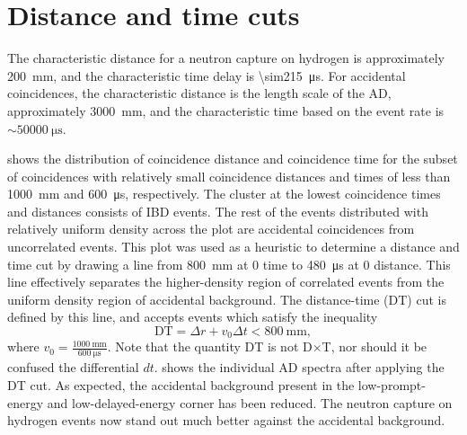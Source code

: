\section{Distance and time cuts}
\label{sec:DT_cut}

The characteristic distance for a neutron capture on hydrogen
is approximately \SI{200}{\milli\meter},
and the characteristic time delay is \SI{\sim215}{\us}.
For accidental coincidences, the characteristic distance is
the length scale of the AD, approximately \SI{3000}{\milli\meter},
and the characteristic time based on the  event rate
is $\sim\SI{50000}{\us}$.


 shows the distribution of
coincidence distance and coincidence time
for the subset of  coincidences with
relatively small coincidence distances and times
of less than \SI{1000}{\milli\meter} and \SI{600}{\micro\second},
respectively.
The cluster at the lowest coincidence times and distances
consists of IBD events.
The rest of the events distributed with relatively uniform density
across the plot are accidental coincidences from uncorrelated events.
This plot was used as a heuristic to determine a distance and time cut
by drawing a line from \SI{800}{\milli\meter} at $0$ time
to \SI{480}{\micro\second} at $0$ distance.
This line effectively separates the higher-density region
of correlated events from the uniform density region of accidental background.
The distance-time (DT) cut is defined by this line,
and accepts events which satisfy the inequality
\begin{equation}\label{eq:DT}
    \text{DT} = \Delta r + v_0 \Delta t < \SI{800}{\milli\meter},
\end{equation}
where $v_0 = \frac{\SI{1000}{\milli\meter}}{\SI{600}{\micro\second}}$.
Note that the quantity DT is not D$\times$T,
nor should it be confused the differential $dt$.
 shows the individual AD spectra
after applying the DT cut.
As expected, the accidental background present
in the low-prompt-energy and low-delayed-energy corner has been reduced.
The neutron capture on hydrogen events now stand out much better
against the accidental background.


